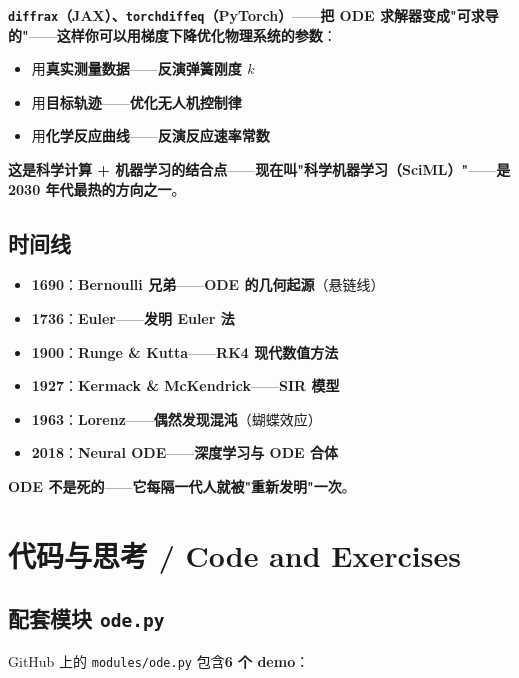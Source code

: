 \textbf{\texttt{diffrax}（JAX）、\texttt{torchdiffeq}（PyTorch）}——\textbf{把 ODE 求解器变成"可求导的"}——\textbf{这样你可以\textbf{用梯度下降优化物理系统的参数}}：

\begin{itemize}
\item 用\textbf{真实测量数据}——\textbf{反演弹簧刚度 $k$}
\item 用\textbf{目标轨迹}——\textbf{优化无人机控制律}
\item 用\textbf{化学反应曲线}——\textbf{反演反应速率常数}
\end{itemize}

\textbf{这是\textbf{科学计算 + 机器学习}的结合点}——\textbf{现在叫"科学机器学习（SciML）"}——\textbf{是 2030 年代最热的方向之一}。

\subsection{时间线}

\begin{itemize}
\item \textbf{1690}：\textbf{Bernoulli 兄弟}——\textbf{ODE 的几何起源}（悬链线）
\item \textbf{1736}：\textbf{Euler}——\textbf{发明 Euler 法}
\item \textbf{1900}：\textbf{Runge \& Kutta}——\textbf{RK4 现代数值方法}
\item \textbf{1927}：\textbf{Kermack \& McKendrick}——\textbf{SIR 模型}
\item \textbf{1963}：\textbf{Lorenz}——\textbf{偶然发现混沌}（蝴蝶效应）
\item \textbf{2018}：\textbf{Neural ODE}——\textbf{深度学习与 ODE 合体}
\end{itemize}

\textbf{ODE 不是死的}——\textbf{它每隔一代人就被"重新发明"一次}。

\section{代码与思考 / Code and Exercises}

\subsection{配套模块 \texttt{ode.py}}

GitHub 上的 \texttt{modules/ode.py} 包含\textbf{6 个 demo}：

